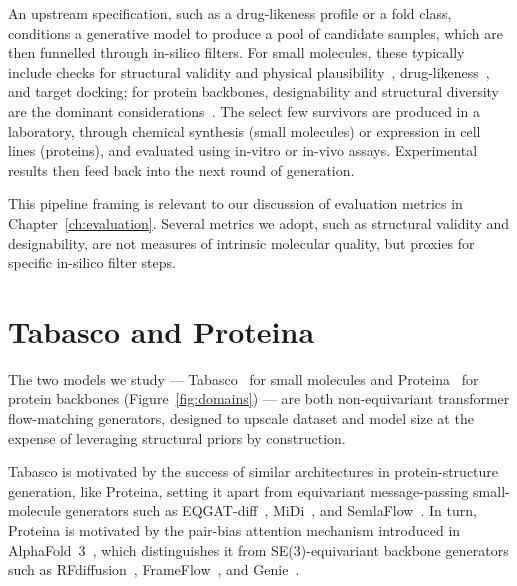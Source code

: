 \documentclass[12pt,a4paper,twoside]{report}
\begin{document}
An upstream specification, such as a drug-likeness profile or a fold class, conditions a generative model to produce a pool of candidate samples, which are then funnelled through in-silico filters. For small molecules, these typically include checks for structural validity and physical plausibility~\cite{PoseBusters}, drug-likeness~\cite{QED}, and target docking; for protein backbones, designability and structural diversity are the dominant considerations~\cite{Proteina}. The select few survivors are produced in a laboratory, through chemical synthesis (small molecules) or expression in cell lines (proteins), and evaluated using in-vitro or in-vivo assays. Experimental results then feed back into the next round of generation.

This pipeline framing is relevant to our discussion of evaluation metrics in Chapter~\ref{ch:evaluation}. Several metrics we adopt, such as structural validity and designability, are not measures of intrinsic molecular quality, but proxies for specific in-silico filter steps.

\section{Tabasco and Proteina}
\label{sec:molecular-domains}

The two models we study --- Tabasco~\cite{Tabasco} for small molecules and Proteina~\cite{Proteina} for protein backbones (Figure~\ref{fig:domains}) --- are both non-equivariant transformer flow-matching generators, designed to upscale dataset and model size at the expense of leveraging structural priors by construction.



Tabasco is motivated by the success of similar architectures in protein-structure generation, like Proteina, setting it apart from equivariant message-passing small-molecule generators such as EQGAT-diff~\cite{EQGATdiff}, MiDi~\cite{MiDi}, and SemlaFlow~\cite{SemlaFlow}. In turn, Proteina is motivated by the pair-bias attention mechanism introduced in AlphaFold~3~\cite{AlphaFold3}, which distinguishes it from SE(3)-equivariant backbone generators such as RFdiffusion~\cite{RFdiffusion}, FrameFlow~\cite{FrameFlow}, and Genie~\cite{Genie}.
\end{document}
